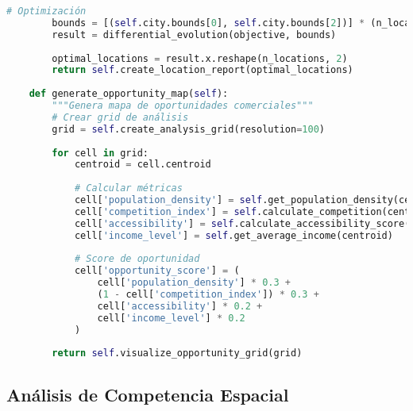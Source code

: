 \documentclass[12pt,a4paper]{article}
\begin{document}
\begin{lstlisting}[language=Python, caption=Motor de análisis locacional]
        # Optimización
        bounds = [(self.city.bounds[0], self.city.bounds[2])] * (n_locations * 2)
        result = differential_evolution(objective, bounds)
        
        optimal_locations = result.x.reshape(n_locations, 2)
        return self.create_location_report(optimal_locations)
    
    def generate_opportunity_map(self):
        """Genera mapa de oportunidades comerciales"""
        # Crear grid de análisis
        grid = self.create_analysis_grid(resolution=100)
        
        for cell in grid:
            centroid = cell.centroid
            
            # Calcular métricas
            cell['population_density'] = self.get_population_density(centroid)
            cell['competition_index'] = self.calculate_competition(centroid)
            cell['accessibility'] = self.calculate_accessibility_score(centroid)[0]
            cell['income_level'] = self.get_average_income(centroid)
            
            # Score de oportunidad
            cell['opportunity_score'] = (
                cell['population_density'] * 0.3 +
                (1 - cell['competition_index']) * 0.3 +
                cell['accessibility'] * 0.2 +
                cell['income_level'] * 0.2
            )
        
        return self.visualize_opportunity_grid(grid)
\end{lstlisting}

\subsection{Análisis de Competencia Espacial}
\end{document}
